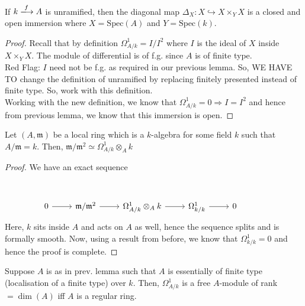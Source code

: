 \documentclass[oneside, 12pt, ]{scrbook}
\newcommand{\spec}{\mathrm{Spec}}
\newcommand{\m}{\mathfrak{m}}
\theoremstyle{theorem}
\begin{document}
\begin{corollary}
If $k \xlongrightarrow{f} A$ is unramified, then the diagonal map $\Delta_{X}: X \hookrightarrow X \times_{Y} X$ is a closed and open immersion where $X =\spec(A)$ and $Y = \spec(k)$.
\end{corollary}

\begin{proof}
Recall that by definition $\Omega_{A/k}^{1} = I/I^2$ where $I$ is the ideal of $X$ inside $X \times_{Y} X$. The module of differential is of f.g. since $A$ is of finite type.\\

\textcolor{BrickRed}{Red Flag}: $I$ need not be f.g. as required in our previous lemma. So, WE HAVE TO change the definition of unramified by replacing finitely presented instead of finite type. So, work with this definition. \\

Working with the new definition, we know that $\Omega_{A/k}^{1} = 0 \Rightarrow I=I^2$ and hence from previous lemma, we know that this immersion is open.  
\end{proof}

\begin{lemma}
Let $(A, \m)$ be a local ring which is a $k$-algebra for some field $k$ such that $A/\m = k$. Then, $\m / \m^2 \simeq \Omega_{A/k}^{1} \otimes_{A} k $
\end{lemma}

\begin{proof}
We have an exact sequence 
\[\begin{tikzcd}
	&&&&& {} \\
	0 & {\m/\m^2} & {\Omega_{A/k}^{1} \otimes_{A} k } & {\Omega_{k/k}^{1}} & 0
	\arrow[from=2-1, to=2-2]
	\arrow[from=2-2, to=2-3]
	\arrow[from=2-3, to=2-4]
	\arrow[from=2-4, to=2-5]
\end{tikzcd}\]
Here, $k$ sits inside $A$ and acts on $A$ as well, hence the sequence splits and is formally smooth. Now, using a result from before, we know that $\Omega_{k/k}^{1} = 0$ and hence the proof is complete.
\end{proof}

\begin{lemma}
Suppose $A$ is as in prev. lemma such that $A$ is essentially of finite type (localisation of a finite type) over $k$. Then, $\Omega_{A/k}^{1}$ is a free $A$-module of rank$= \dim(A)$ iff $A$ is a regular ring.  
\end{lemma}
\end{document}
